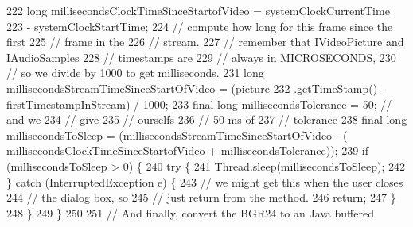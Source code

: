 \begin{DoxyCode}
222                             \textcolor{keywordtype}{long} millisecondsClockTimeSinceStartofVideo = systemClockCurrentTime
223                                     - systemClockStartTime;
224                             \textcolor{comment}{// compute how long for this frame since the first}
225                             \textcolor{comment}{// frame in the}
226                             \textcolor{comment}{// stream.}
227                             \textcolor{comment}{// remember that IVideoPicture and IAudioSamples}
228                             \textcolor{comment}{// timestamps are}
229                             \textcolor{comment}{// always in MICROSECONDS,}
230                             \textcolor{comment}{// so we divide by 1000 to get milliseconds.}
231                             \textcolor{keywordtype}{long} millisecondsStreamTimeSinceStartOfVideo = (picture
232                                     .getTimeStamp() - firstTimestampInStream) / 1000;
233                             \textcolor{keyword}{final} \textcolor{keywordtype}{long} millisecondsTolerance = 50; \textcolor{comment}{// and we}
234                                                                     \textcolor{comment}{// give}
235                                                                     \textcolor{comment}{// ourselfs}
236                                                                     \textcolor{comment}{// 50 ms of}
237                                                                     \textcolor{comment}{// tolerance}
238                             \textcolor{keyword}{final} \textcolor{keywordtype}{long} millisecondsToSleep = (millisecondsStreamTimeSinceStartOfVideo - (
      millisecondsClockTimeSinceStartofVideo + millisecondsTolerance));
239                             \textcolor{keywordflow}{if} (millisecondsToSleep > 0) \{
240                                 \textcolor{keywordflow}{try} \{
241                                     Thread.sleep(millisecondsToSleep);
242                                 \} \textcolor{keywordflow}{catch} (InterruptedException e) \{
243                                     \textcolor{comment}{// we might get this when the user closes}
244                                     \textcolor{comment}{// the dialog box, so}
245                                     \textcolor{comment}{// just return from the method.}
246                                     \textcolor{keywordflow}{return};
247                                 \}
248                             \}
249                         \}
250 
251                         \textcolor{comment}{// And finally, convert the BGR24 to an Java buffered}

\end{DoxyCode}

